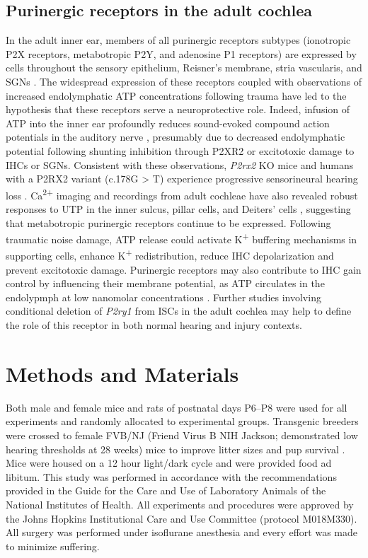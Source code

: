 \documentclass[9pt,lineno]{elife}
\begin{document}
\subsection{Purinergic receptors in the adult cochlea}
In the adult inner ear, members of all purinergic receptors subtypes (ionotropic P2X receptors, metabotropic P2Y, and adenosine P1 receptors) are expressed by cells throughout the sensory epithelium, Reisner’s membrane, stria vascularis, and SGNs \citep{Housley2009a,Huang2010}. The widespread expression of these receptors coupled with observations of increased endolymphatic ATP concentrations following trauma \citep{Munoz1995} have led to the hypothesis that these receptors serve a neuroprotective role. Indeed, infusion of ATP into the inner ear profoundly reduces sound-evoked compound action potentials in the auditory nerve \citep{Bobbin1978a,Munoz1995b}, presumably due to decreased endolymphatic potential following shunting inhibition through P2XR2 \citep{Housley2013b} or excitotoxic damage \citep{Cisneros-Mejorado2014} to IHCs or SGNs. Consistent with these observations, \textit{P2rx2} KO mice and humans with a P2RX2 variant (c.178G > T) experience progressive sensorineural hearing loss \citep{Yan2013a}. Ca\textsuperscript{2+} imaging and recordings from adult cochleae have also revealed robust responses to UTP in the inner sulcus, pillar cells, and Deiters' cells \citep{Sirko2019,Zhu2010a}, suggesting that metabotropic purinergic receptors continue to be expressed. Following traumatic noise damage, ATP release could activate K\textsuperscript{+} buffering mechanisms in supporting cells, enhance K\textsuperscript{+} redistribution, reduce IHC depolarization and prevent excitotoxic damage. Purinergic receptors may also contribute to IHC gain control by influencing their membrane potential, as ATP circulates in the endolypmph at low nanomolar concentrations \citep{Munoz1995}. Further studies involving conditional deletion of \textit{P2ry1} from ISCs in the adult cochlea may help to define the role of this receptor in both normal hearing and injury contexts.


\section{Methods and Materials}

Both male and female mice and rats of postnatal days P6--P8 were used for all experiments and randomly allocated to experimental groups. Transgenic breeders were crossed to female FVB/NJ (Friend Virus B NIH Jackson; demonstrated low hearing thresholds at 28 weeks) mice to improve litter sizes and pup survival \citep{Zheng1999}. Mice were housed on a 12 hour light/dark cycle and were provided food ad libitum. This study was performed in accordance with the recommendations provided in the Guide for the Care and Use of Laboratory Animals of the National Institutes of Health. All experiments and procedures were approved by the Johns Hopkins Institutional Care and Use Committee (protocol M018M330). All surgery was performed under isoflurane anesthesia and every effort was made to minimize suffering.
\end{document}
